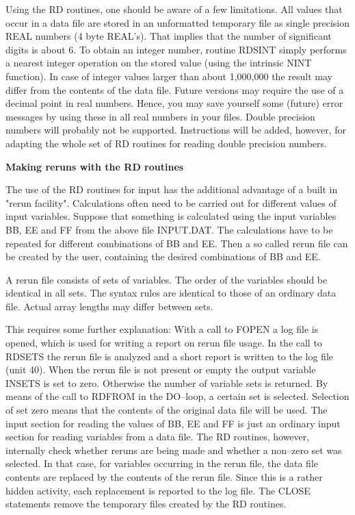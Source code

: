 \documentclass[11pt]{article}
\begin{document}
Using the RD routines, one should be aware of a few limitations. All values that occur in
a data file are stored in an unformatted temporary file as single precision REAL numbers
(4 byte REAL's). That implies that the number of significant digits is about 6. To obtain
an integer number, routine RDSINT simply performs a nearest  integer operation on the
stored value (using the intrinsic NINT function). In case of integer values larger than
about 1,000,000 the result may differ from the contents of the data file. Future versions
may require the use of a decimal point in real numbers. Hence, you may save yourself
some (future) error messages by using these in all real numbers in your files. Double
precision numbers will probably not be supported. Instructions will be added, however,
for adapting the whole set of RD routines for reading double precision numbers.

\bigskip
\bigskip
{\bf Making reruns with the RD routines}

The use of the RD routines for input has the additional advantage of a built in "rerun
facility". Calculations often need to be carried out for different values of input variables.
Suppose that something is calculated using the input variables BB, EE and FF from the
above file INPUT.DAT. The calculations have to be repeated for different combinations
of BB and EE. Then a so called rerun file can be created by the user, containing the
desired combinations of BB and EE.

A rerun file consists of sets of variables. The order of the variables should be identical in
all sets. The syntax rules are identical to those of an ordinary data file. Actual array
lengths may differ between sets.

This requires some further explanation: With a call to FOPEN a log file is opened, which
is used for writing a report on rerun file usage. In the call to RDSETS the rerun file is
analyzed and a short report is written to the log file (unit 40). When the rerun file is not
present or empty the output variable INSETS is set to zero. Other\-wise the number of
variable sets is returned. By means of the call to RDFROM in the DO--{}loop, a certain set
is selected. Selection of set zero means that the contents of the original data file will be
used. The input section for reading the values of BB, EE and FF is just an ordinary input
section for reading variables from a data file. The RD routines, however, internally check
whether reruns are being made and whether a non--{}zero set was selected. In that case, for
variables occurring in the rerun file, the data file contents are replaced by the contents of
the rerun file. Since this is a rather hidden activity, each replacement is reported to the
log file. The CLOSE statements remove the temporary files created by the RD routines.
\end{document}
